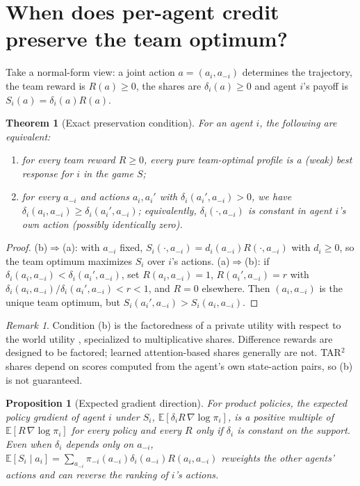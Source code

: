 \documentclass[11pt]{article}
\newtheorem{theorem}{Theorem}
\newtheorem{proposition}{Proposition}
\theoremstyle{remark}
\newtheorem{remark}{Remark}
\newcommand{\E}{\mathbb{E}}
\begin{document}
\section{When does per-agent credit preserve the team optimum?}

Take a normal-form view: a joint action $a=(a_i,a_{-i})$ determines the trajectory, the team reward is $R(a)\ge0$, the shares are $\delta_i(a)\ge0$ and agent $i$'s payoff is $S_i(a)=\delta_i(a)R(a)$.

\begin{theorem}[Exact preservation condition]\label{thm:c1}
For an agent $i$, the following are equivalent:
\begin{enumerate}
\item[(a)] for every team reward $R\ge0$, every pure team-optimal profile is a (weak) best response for $i$ in the game $S$;
\item[(b)] for every $a_{-i}$ and actions $a_i,a_i'$ with $\delta_i(a_i',a_{-i})>0$, we have $\delta_i(a_i,a_{-i})\ge\delta_i(a_i',a_{-i})$; equivalently, $\delta_i(\cdot,a_{-i})$ is constant in agent $i$'s own action (possibly identically zero).
\end{enumerate}
\end{theorem}

\begin{proof}
(b)$\Rightarrow$(a): with $a_{-i}$ fixed, $S_i(\cdot,a_{-i})=d_i(a_{-i})R(\cdot,a_{-i})$ with $d_i\ge0$, so the team optimum maximizes $S_i$ over $i$'s actions.
(a)$\Rightarrow$(b): if $\delta_i(a_i,a_{-i})<\delta_i(a_i',a_{-i})$, set $R(a_i,a_{-i})=1$, $R(a_i',a_{-i})=r$ with $\delta_i(a_i,a_{-i})/\delta_i(a_i',a_{-i})<r<1$, and $R=0$ elsewhere. Then $(a_i,a_{-i})$ is the unique team optimum, but $S_i(a_i',a_{-i})>S_i(a_i,a_{-i})$.
\end{proof}

\begin{remark}
Condition (b) is the factoredness of a private utility with respect to the world utility \citep{wolpert1999coin}, specialized to multiplicative shares. Difference rewards are designed to be factored; learned attention-based shares generally are not. TAR$^2$ shares depend on scores computed from the agent's own state-action pairs, so (b) is not guaranteed.
\end{remark}

\begin{proposition}[Expected gradient direction]\label{prop:grad}
For product policies, the expected policy gradient of agent $i$ under $S_i$, $\E[\delta_iR\,\nabla\log\pi_i]$, is a positive multiple of $\E[R\,\nabla\log\pi_i]$ for every policy and every $R$ only if $\delta_i$ is constant on the support. Even when $\delta_i$ depends only on $a_{-i}$, $\E[S_i\mid a_i]=\sum_{a_{-i}}\pi_{-i}(a_{-i})\delta_i(a_{-i})R(a_i,a_{-i})$ reweights the other agents' actions and can reverse the ranking of $i$'s actions.
\end{proposition}
\end{document}
